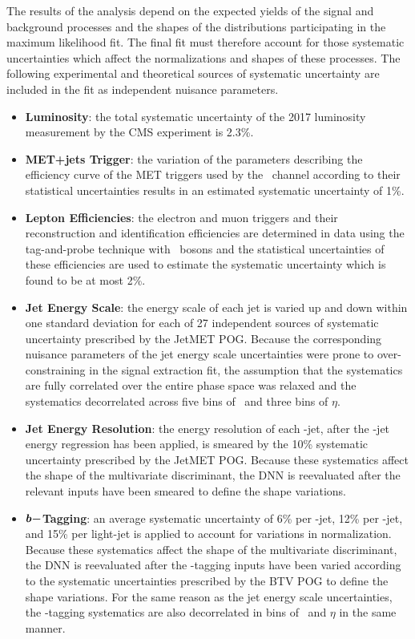 The results of the analysis depend on the expected yields of the signal and background processes and the shapes of the distributions participating in the maximum likelihood fit. The final fit must therefore account for those systematic uncertainties which affect the normalizations and shapes of these processes. The following experimental and theoretical sources of systematic uncertainty are included in the fit as independent nuisance parameters.

\begin{itemize}
  \item \textbf{Luminosity}: the total systematic uncertainty of the 2017 luminosity measurement by the CMS experiment is 2.3\%.\cite{UNCLUMI}
  \item \textbf{MET+jets Trigger}: the variation of the parameters describing the efficiency curve of the MET triggers used by the \ZnnH\ channel according to their statistical uncertainties results in an estimated systematic uncertainty of 1\%.
  \item \textbf{Lepton Efficiencies}: the electron and muon triggers and their reconstruction and identification efficiencies are determined in data using the tag-and-probe technique with \bosZ\ bosons and the statistical uncertainties of these efficiencies are used to estimate the systematic uncertainty which is found to be at most 2\%.
  \item \textbf{Jet Energy Scale}: the energy scale of each jet is varied up and down within one standard deviation for each of 27 independent sources of systematic uncertainty prescribed by the JetMET POG. Because the corresponding nuisance parameters of the jet energy scale uncertainties were prone to over-constraining in the signal extraction fit, the assumption that the systematics are fully correlated over the entire phase space was relaxed and the systematics decorrelated across five bins of \pT\ and three bins of $\eta$.
  \item \textbf{Jet Energy Resolution}: the energy resolution of each \qrkb-jet, after the \qrkb-jet energy regression has been applied, is smeared by the 10\% systematic uncertainty prescribed by the JetMET POG. Because these systematics affect the shape of the multivariate discriminant, the DNN is reevaluated after the relevant inputs have been smeared to define the shape variations.
  \item \textbf{$\boldsymbol{b-}$Tagging}: an average systematic uncertainty of 6\% per \qrkb-jet, 12\% per \qrkc-jet, and 15\% per light-jet is applied to account for variations in normalization. Because these systematics affect the shape of the multivariate discriminant, the DNN is reevaluated after the \qrkb-tagging inputs have been varied according to the systematic uncertainties prescribed by the BTV POG to define the shape variations. For the same reason as the jet energy scale uncertainties, the \qrkb-tagging systematics are also decorrelated in bins of \pT\ and $\eta$ in the same manner.

\end{itemize}
